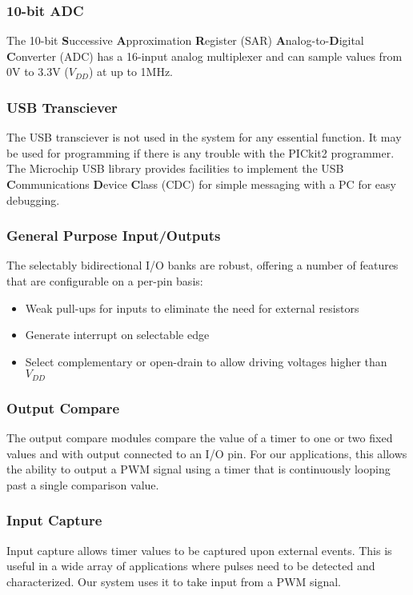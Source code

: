 \subsubsection{10-bit ADC}
The 10-bit \textbf{S}uccessive \textbf{A}pproximation \textbf{R}egister (SAR) \textbf{A}nalog-to-\textbf{D}igital \textbf{C}onverter (ADC) has a 16-input analog multiplexer and can sample values from 0V to 3.3V ($V_{DD}$) at up to 1MHz.
\subsubsection{USB Transciever}
The USB transciever is not used in the system for any essential function. It may be used for programming if there is any trouble with the PICkit2 programmer. The Microchip USB library provides facilities to implement the USB \textbf{C}ommunications \textbf{D}evice \textbf{C}lass (CDC) for simple messaging with a PC for easy debugging.
\subsubsection{General Purpose Input/Outputs}
The selectably bidirectional I/O banks are robust, offering a number of features that are configurable on a per-pin basis:
\begin{itemize}
\item Weak pull-ups for inputs to eliminate the need for external resistors
\item Generate interrupt on selectable edge
\item Select complementary or open-drain to allow driving voltages higher than $V_{DD}$
\end{itemize}
\subsubsection{Output Compare}
The output compare modules compare the value of a timer to one or two fixed values and with output connected to an I/O pin. For our applications, this allows the ability to output a PWM signal using a timer that is continuously looping past a single comparison value.
\subsubsection{Input Capture}
Input capture allows timer values to be captured upon external events. This is useful in a wide array of applications where pulses need to be detected and characterized. Our system uses it to take input from a PWM signal.

